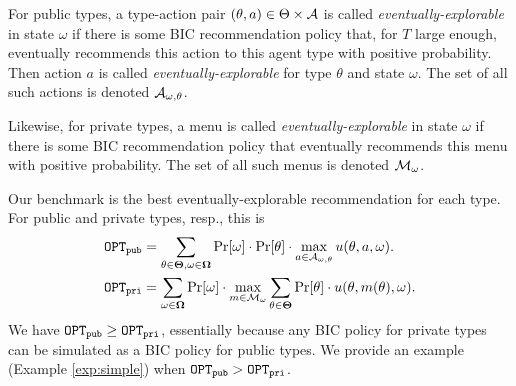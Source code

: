 For public types, a type-action pair $(\theta,a)\in \Theta\times \mathcal{A}$ is called \emph{eventually-explorable} in state $\omega$ if there is some BIC recommendation policy that, for $T$ large enough, eventually recommends this action to this agent type with positive probability. Then action $a$ is called \emph{eventually-explorable} for type $\theta$ and state $\omega$. The set of all such actions is denoted $\mathcal{A}_{\omega,\theta}$. 

Likewise, for private types, a menu is called \emph{eventually-explorable} in state $\omega$ if there is some BIC recommendation policy that eventually recommends this menu with positive probability. The set of all such menus is denoted $\mathcal{M}_{\omega}$.

Our benchmark is the best eventually-explorable recommendation for each type. For public and private types, resp., this is
\begin{align}
\mathtt{OPT}_{\mathtt{pub}} &= \sum_{\theta \in \bold{\Theta}, \omega\in \bold{\Omega}} \Pr[\omega] \cdot \Pr[\theta] \cdot \max_{a \in \mathcal{A}_{\omega,\theta}} u(\theta, a, \omega).
    \label{eq:bench-public}\\
\mathtt{OPT}_{\mathtt{pri}} &= \sum_{\omega\in \bold{\Omega}} \Pr[\omega] \cdot\max_{m \in \mathcal{M}_{\omega}}\sum_{\theta \in \bold{\Theta}} \Pr[\theta] \cdot  u(\theta, m(\theta), \omega).\label{eq:bench-private}
\end{align}
We have $\mathtt{OPT}_{\mathtt{pub}} \geq \mathtt{OPT}_{\mathtt{pri}}$, essentially because any BIC policy for private types can be simulated as a BIC policy for public types. We provide an example (Example \ref{exp:simple}) when $\mathtt{OPT}_{\mathtt{pub}} > \mathtt{OPT}_{\mathtt{pri}}$.

